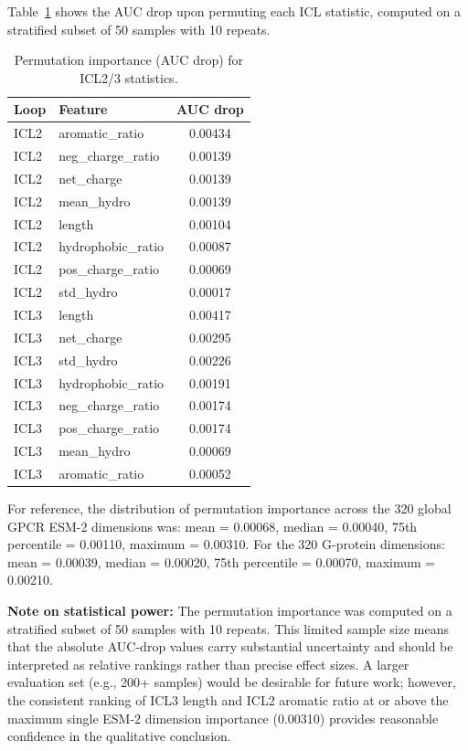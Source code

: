 \documentclass[11pt,a4paper]{article}
\begin{document}
Table~\ref{tab:perm_imp} shows the AUC drop upon permuting each ICL statistic, computed on a stratified subset of 50 samples with 10 repeats.

\begin{table}[H]
\centering
\caption{Permutation importance (AUC drop) for ICL2/3 statistics.}
\label{tab:perm_imp}
\begin{tabular}{llc}
\toprule
\textbf{Loop} & \textbf{Feature} & \textbf{AUC drop} \\
\midrule
ICL2 & aromatic\_ratio & 0.00434 \\
ICL2 & neg\_charge\_ratio & 0.00139 \\
ICL2 & net\_charge & 0.00139 \\
ICL2 & mean\_hydro & 0.00139 \\
ICL2 & length & 0.00104 \\
ICL2 & hydrophobic\_ratio & 0.00087 \\
ICL2 & pos\_charge\_ratio & 0.00069 \\
ICL2 & std\_hydro & 0.00017 \\
\midrule
ICL3 & length & 0.00417 \\
ICL3 & net\_charge & 0.00295 \\
ICL3 & std\_hydro & 0.00226 \\
ICL3 & hydrophobic\_ratio & 0.00191 \\
ICL3 & neg\_charge\_ratio & 0.00174 \\
ICL3 & pos\_charge\_ratio & 0.00174 \\
ICL3 & mean\_hydro & 0.00069 \\
ICL3 & aromatic\_ratio & 0.00052 \\
\bottomrule
\end{tabular}
\end{table}

For reference, the distribution of permutation importance across the 320 global GPCR ESM-2 dimensions was: mean = 0.00068, median = 0.00040, 75th percentile = 0.00110, maximum = 0.00310. For the 320 G-protein dimensions: mean = 0.00039, median = 0.00020, 75th percentile = 0.00070, maximum = 0.00210.

\textbf{Note on statistical power:} The permutation importance was computed on a stratified subset of 50 samples with 10 repeats. This limited sample size means that the absolute AUC-drop values carry substantial uncertainty and should be interpreted as relative rankings rather than precise effect sizes. A larger evaluation set (e.g., 200+ samples) would be desirable for future work; however, the consistent ranking of ICL3 length and ICL2 aromatic ratio at or above the maximum single ESM-2 dimension importance (0.00310) provides reasonable confidence in the qualitative conclusion.
\end{document}
